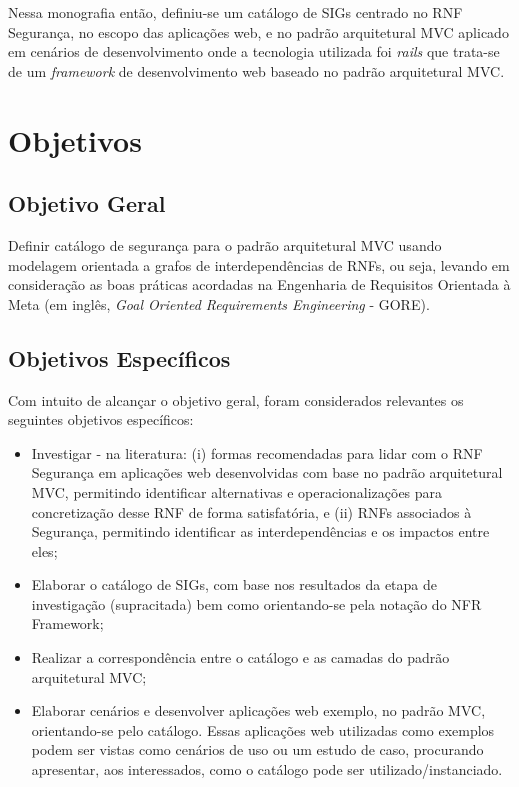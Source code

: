 Nessa monografia então, definiu-se um catálogo de SIGs centrado no RNF Segurança, no escopo das aplicações web, e no padrão arquitetural MVC aplicado em cenários de desenvolvimento onde a tecnologia utilizada foi \textit{rails} que trata-se de um \textit{framework} de desenvolvimento web baseado no padrão arquitetural MVC. 

\section{Objetivos}
 
\subsection{Objetivo Geral}

Definir catálogo de segurança para o padrão arquitetural MVC usando modelagem orientada a grafos de interdependências de RNFs, ou seja, levando em consideração as boas práticas acordadas na Engenharia de Requisitos Orientada à Meta (em inglês, \textit{Goal Oriented Requirements Engineering} - GORE). 

\subsection{Objetivos Específicos}

Com intuito de alcançar o objetivo geral, foram considerados relevantes os seguintes objetivos específicos:

\begin{itemize}
	
	\item Investigar - na literatura: (i) formas recomendadas para lidar com o RNF Segurança em aplicações web desenvolvidas com base no padrão arquitetural MVC, permitindo identificar alternativas e operacionalizações para concretização desse RNF de forma satisfatória, e (ii) RNFs associados à Segurança, permitindo identificar as interdependências e os impactos entre eles;
	
	\item Elaborar o catálogo de SIGs, com base nos resultados da etapa de investigação (supracitada) bem como orientando-se pela notação do NFR Framework;
	
	\item Realizar a correspondência entre o  catálogo e as camadas do padrão arquitetural MVC;
	
	
	\item Elaborar cenários e desenvolver aplicações web exemplo, no padrão MVC, orientando-se pelo catálogo. Essas aplicações web utilizadas como exemplos podem ser vistas como cenários de uso ou um estudo de caso, procurando apresentar, aos interessados, como o catálogo pode ser utilizado/instanciado. 
	
\end{itemize}

